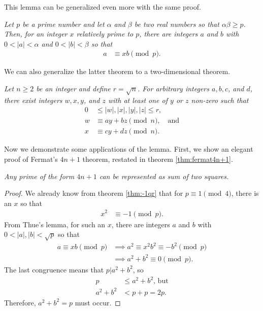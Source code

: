 \documentclass{subfile}
\begin{document}
	This lemma can be generalized even more with the same proof.
	\begin{theorem}\slshape
		Let $p$ be a prime number and let $\alpha$ and $\beta$ be two real numbers so that $\alpha\beta \geq p$. Then, for an integer $x$ relatively prime to $p$, there are integers $a$ and $b$ with $0<|a|<\alpha$ and $0<|b|<\beta $ so that
		\begin{align*}
			a & \equiv xb\pmod p.
		\end{align*} 
	\end{theorem}
	We can also generalize the latter theorem to a two-dimensional theorem.
	\begin{theorem}\slshape
		Let $n\geq2$ be an integer and define $r=\sqrt{n}$. For arbitrary integers $a,b,c$, and $d$, there exist integers $w,x,y$, and $z$ with at least one of $y$ or $z$ non-zero such that
		\begin{align*}
			0& \leq |w|,|x|,|y|,|z|\leq r,\\
			w&\equiv ay+bz\pmod n, \quad \text{and}\\
			x&\equiv cy+dz\pmod n.
		\end{align*}
	\end{theorem}
	
	
	Now we demonstrate some applications of the lemma. First, we show an elegant proof of Fermat's $4n+1$ theorem, restated in theorem \eqref{thm:fermat4n+1}.
	
	\begin{theorem}\slshape\label{thm:fermat4n+1}
		Any prime of the form $4n+1$ can be represented as sum of two squares.
	\end{theorem}

	\begin{proof}
		We already know from theorem \eqref{thm:-1qr} that for $p\equiv1\pmod4$, there is an $x$ so that
		\begin{align*}
			x^2 & \equiv-1\pmod p.
		\end{align*}
		From Thue's lemma, for such an $x$, there are integers $a$ and $b$ with $0<|a|,|b|<\sqrt{p}$ so that
		\begin{align*}
			a \equiv xb \pmod p & \implies	a^2 \equiv x^2b^2 \equiv -b^2\pmod p\\
			& \implies	a^2+b^2 \equiv 0 \pmod p.
		\end{align*}
		The last congruence means that $p|a^2+b^2$, so
		\begin{align*}
			p   &\leq a^2+b^2\text {, but}\\
			a^2+b^2	&< p+p = 2p.
		\end{align*}
		Therefore, $a^2+b^2=p$ must occur.
	\end{proof}
\end{document}
